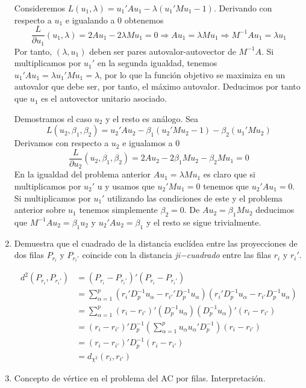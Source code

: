 \documentclass[twoside]{article}
\begin{document}
\begin{enumerate}
Consideremos $L(u_1,\lambda) = u_1'Au_1 - \lambda(u_1'Mu_1-1)$. Derivando con respecto a $u_1$ e igualando a $0$ obtenemos
$$
\frac{L}{\partial u_1}(u_1,\lambda)= 2Au_1 -2\lambda Mu_1 = 0 \Rightarrow Au_1 = \lambda M u_1 \Rightarrow  M^{-1}A u_1 = \lambda u_1
$$
Por tanto, $(\lambda,u_1)$ deben ser pares autovalor-autovector de $M^{-1}A$. Si multiplicamos por $u_1'$ en la segunda igualdad, tenemos $u_1' A u_1 = \lambda u_1'Mu_1 = \lambda$, por lo que la función objetivo se maximiza en un autovalor que debe ser, por tanto, el máximo autovalor. Deducimos por tanto que $u_1$ es el autovector unitario asociado. 

Demostramos el caso $u_2$ y el resto es análogo. Sea
$$
L(u_2,\beta_1,\beta_2) = u_2'Au_2 - \beta_1(u_2'Mu_2-1) - \beta_2(u_1'Mu_2)
$$
Derivamos con respecto a $u_2$ e igualamos a $0$
$$
\frac{L}{\partial u_2}(u_2,\beta_1,\beta_2) = 2Au_2 -2\beta_1 Mu_2 - \beta_2Mu_1 = 0 
$$
En la igualdad del problema anterior $Au_1 = \lambda Mu_1$ es claro que si multiplicamos por $u_2'$ u y usamos que $u_2'Mu_1=0$ tenemos que $u_2'Au_1 =0$. Si multiplicamos por $u_1'$ utilizando las condiciones de este y el problema anterior sobre $u_1$ tenemos simplemente $\beta_2 = 0$. De $Au_2 = \beta_1 M u_2$ deducimos que $M^{-1}Au_2 =\beta_1 u_2$ y $u_2'Au_2 = \beta_1$ y el resto se sigue trivialmente.


\item Demuestra que el cuadrado de la distancia euclídea entre las proyecciones de dos filas $P_{r_i}$ y $P_{r_i'}$ coincide con la distancia \emph{ji−cuadrado} entre las filas $r_i$ y $r_i'$.


\begin{align*}
d^2(P_{r_i},P_{r_i'}) &= (P_{r_i}-P_{r_i'})'(P_{r_i}-P_{r_i'})\\
&=\sum_{\alpha=1}^p (r_i' D^{-1}_p u_\alpha - r_{i'}' D^{-1}_p u_\alpha )(r_i' D^{-1}_p u_\alpha - r_{i'} D^{-1}_p u_\alpha )\\
&=\sum_{\alpha=1}^p (r_i-r_{i'})' (D^{-1}_p u_\alpha)(D^{-1}_p u_\alpha)'(r_i-r_{i'})\\
&=(r_i-r_{i'})'D^{-1}_p\left(\sum_{\alpha=1}^p u_\alpha  u_\alpha' D^{-1}_p \right)(r_i-r_{i'})\\
&=(r_i-r_{i'})'D^{-1}_p(r_i-r_{i'})\\
&= d_{\chi^2}(r_i,r_{i'})
\end{align*}


\item Concepto de vértice en el problema del AC por filas. Interpretación. 


\end{enumerate}
\end{document}
